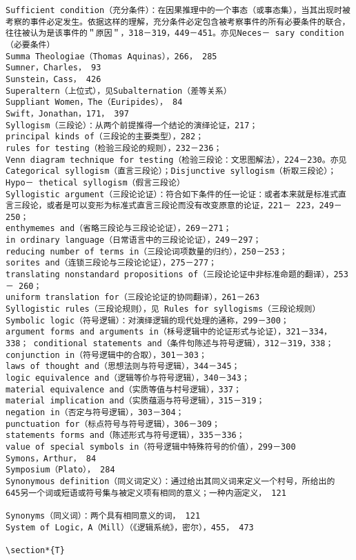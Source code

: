 \begin{verbatim}
Sufficient condition（充分条件）：在因果推理中的一个事态（或事态集），当其出现时被考察的事件必定发生。依据这样的理解，充分条件必定包含被考察事件的所有必要条件的联合，往往被认为是该事件的＂原因＂，318－319，449－451。亦见Neces－ sary condition（必要条件）
Summa Theologiae（Thomas Aquinas），266， 285
Sumner，Charles， 93
Sunstein，Cass， 426
Superaltern（上位式），见Subalternation（差等关系）
Suppliant Women，The（Euripides）， 84
Swift，Jonathan，171， 397
Syllogism（三段论）：从两个前提推得一个结论的演绎论证，217；
principal kinds of（三段论的主要类型），282；
rules for testing（检验三段论的规则），232－236；
Venn diagram technique for testing（检验三段论：文思图解法），224－230。亦见 Categorical syllogism（直言三段论）；Disjunctive syllogism（析取三段论）；Hypo－ thetical syllogism（假言三段论）
Syllogistic argument（三段论论证）：符合如下条件的任一论证：或者本来就是标准式直言三段论，或者是可以变形为标准式直言三段论而没有改变原意的论证，221－ 223，249－250；
enthymemes and（省略三段论与三段论论证），269－271；
in ordinary language（日常语言中的三段论论证），249－297；
reducing number of terms in（三段论词项数量的归约），250－253；
sorites and（连锁三段论与三段论论证），275－277；
translating nonstandard propositions of（三段论论证中非标准命题的翻译），253－ 260；
uniform translation for（三段论论证的协同翻译），261－263
Syllogistic rules（三段论规则），见 Rules for syllogisms（三段论规则）
Symbolic logic（符号逻辑）：对演绎逻辑的现代处理的通称，299－300；
argument forms and arguments in（柇号逻辑中的论证形式与论证），321－334，338； conditional statements and（条件句陈述与符号逻辑），312－319，338；
conjunction in（符号逻辑中的合取），301－303；
laws of thought and（思想法则与符号逻辑），344－345；
logic equivalence and（逻辑等价与符号逻辑），340－343；
material equivalence and（实质等值与村号逻辑），337；
material implication and（实质蕴涵与符号逻辑），315－319；
negation in（否定与符号逻辑），303－304；
punctuation for（标点符号与符号逻辑），306－309；
statements forms and（陈述形式与符号逻辑），335－336；
value of special symbols in（符号逻辑中特殊符号的价值），299－300
Symons，Arthur， 84
Symposium（Plato）， 284
Synonymous definition（同义词定义）：通过给出其同义词来定义一个村号，所给出的 645另一个词或短语或符号集与被定义项有相同的意义；一种内涵定义， 121

Synonyms（同义词）：两个具有相同意义的词， 121
System of Logic，A（Mill）（《逻辑系统》，密尔），455， 473

\section*{T}


\end{verbatim}
